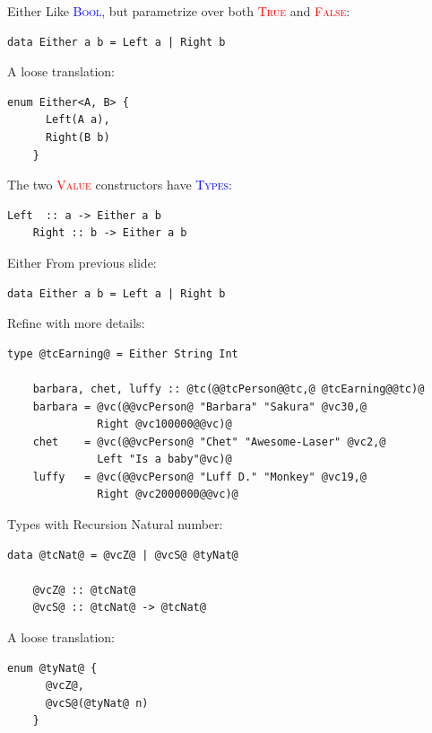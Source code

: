 \documentclass[xcolor={usenames,dvipsnames}]{beamer}
\newcommand{\htycon}[1]{\textcolor{Blue}{\textsc{#1}}}
\newcommand{\hvalcon}[1]{\textcolor{Red}{\textsc{#1}}}
\begin{document}
\begin{frame}[fragile]{Either}
  Like \htycon{Bool}, but parametrize over both \hvalcon{True} and \hvalcon{False}:
  \begin{lstlisting}[style=hask]
    data Either a b = Left a | Right b
  \end{lstlisting}

  \pause
  A loose translation:
  \begin{lstlisting}[style=hask]
    enum Either<A, B> {
      Left(A a),
      Right(B b)
    }
  \end{lstlisting}

  \pause
  The two \hvalcon{Value} constructors have \htycon{Types}:
  \begin{lstlisting}[style=hask]
    Left  :: a -> Either a b
    Right :: b -> Either a b
  \end{lstlisting}
\end{frame}

\begin{frame}[fragile]{Either}
  From previous slide:
  \begin{lstlisting}[style=hask]
    data Either a b = Left a | Right b
  \end{lstlisting}

  \pause
  Refine with more details:
  \begin{lstlisting}[style=hask]
    type @tcEarning@ = Either String Int

    barbara, chet, luffy :: @tc(@@tcPerson@@tc,@ @tcEarning@@tc)@
    barbara = @vc(@@vcPerson@ "Barbara" "Sakura" @vc30,@
              Right @vc100000@@vc)@
    chet    = @vc(@@vcPerson@ "Chet" "Awesome-Laser" @vc2,@
              Left "Is a baby"@vc)@ 
    luffy   = @vc(@@vcPerson@ "Luff D." "Monkey" @vc19,@
              Right @vc2000000@@vc)@
  \end{lstlisting}
\end{frame}

\begin{frame}[fragile]{Types with Recursion}
  Natural number:
  \begin{lstlisting}[style=hask]
    data @tcNat@ = @vcZ@ | @vcS@ @tyNat@

    @vcZ@ :: @tcNat@
    @vcS@ :: @tcNat@ -> @tcNat@
  \end{lstlisting}

  \pause
  A loose translation:
  \begin{lstlisting}[style=hask]
    enum @tyNat@ {
      @vcZ@,
      @vcS@(@tyNat@ n)
    }
  \end{lstlisting}
\end{frame}
\end{document}
